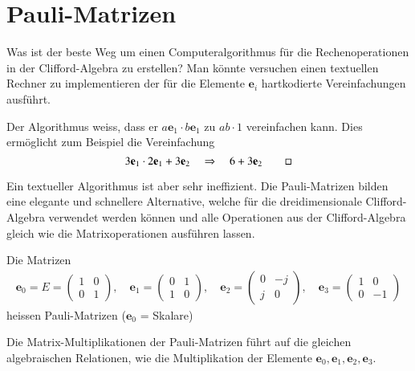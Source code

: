 %
%
%
\section{Pauli-Matrizen}
%

Was ist der beste Weg um einen Computeralgorithmus für die Rechenoperationen in der Clifford-Algebra zu erstellen? Man könnte versuchen einen textuellen Rechner zu implementieren der für die Elemente $\mathbf{e}_i$ hartkodierte Vereinfachungen ausführt.
\begin{beispiel}
	Der Algorithmus weiss, dass er $a\mathbf{e}_1\cdot b\mathbf{e}_1$ zu $ab\cdot1$ vereinfachen kann. Dies ermöglicht zum Beispiel die Vereinfachung
	\begin{equation*}
	3\mathbf{e}_1 \cdot 2\mathbf{e}_1 + 3\mathbf{e}_2 \quad\Rightarrow\quad 6 + 3\mathbf{e}_2
\qedhere
	\end{equation*}
\end{beispiel}
Ein textueller Algorithmus ist aber sehr ineffizient.
Die Pauli-Matrizen bilden eine elegante und schnellere Alternative, welche für die dreidimensionale Clifford-Algebra verwendet werden können und alle Operationen aus der Clifford-Algebra gleich wie die Matrixoperationen ausführen lassen.
\begin{definition} \label{def:defPauli} 
	Die Matrizen
	\begin{align} \label{Pauli}
	\mathbf{e}_0 = E = 
	\begin{pmatrix}
	1 & 0 \\
	0 & 1
	\end{pmatrix},\quad
	\mathbf{e}_1 =
	\begin{pmatrix}
	0 & 1 \\
	1 & 0
	\end{pmatrix},\quad
	\mathbf{e}_2 =
	\begin{pmatrix}
	0 & -j \\
	j & 0
	\end{pmatrix},\quad
	\mathbf{e}_3 =
	\begin{pmatrix}
	1 & 0 \\
	0 & -1
	\end{pmatrix}	
	\end{align}
	heissen Pauli-Matrizen ($\mathbf{e}_0$ = Skalare)
\end{definition}
Die Matrix-Multiplikationen der Pauli-Matrizen führt auf die gleichen algebraischen Relationen, wie die Multiplikation der Elemente $\mathbf{e}_0, \mathbf{e}_1, \mathbf{e}_2, \mathbf{e}_3$.
